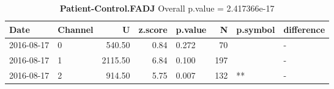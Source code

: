 \begin{table}[ht]
\caption[Patient-Control.FADJ]{\textbf{Patient-Control.FADJ} Overall p.value = 2.417366e-17 }
\centering
\begin{tabular}{llrrlrll}
  \hline
Date & Channel & U & z.score & p.value & N & p.symbol & difference \\ 
  \hline
2016-08-17 & 0 & 540.50 & 0.84 & 0.272 &  70 &  & - \\ 
  2016-08-17 & 1 & 2115.50 & 6.84 & 0.100 & 197 &  & - \\ 
  2016-08-17 & 2 & 914.50 & 5.75 & 0.007 & 132 & ** & - \\ 
   \hline
\end{tabular}
\label{tab:patientControl}
\end{table}
